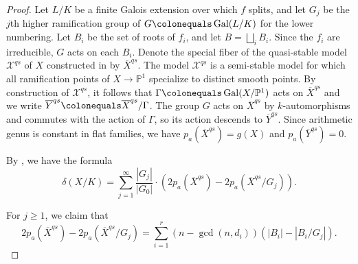 \documentclass[12pt]{amsart}
\numberwithin{equation}{section}
\theoremstyle{definition}
\newcommand{\ol}[1]{\overline{#1}}
\newcommand{\proj}{\mathbb P}
\DeclareMathOperator{\Gal}{Gal}
\begin{document}
\begin{proof}
Let $L/K$ be a finite Galois extension over which $f$ splits, and let
$G_j$ be the $j$th higher ramification group of $G \colonequals \Gal(L/K)$ for the lower
numbering.  Let $B_i$ be the set of roots of $f_i$, and let $B = \bigsqcup_i B_i$.  Since the $f_i$ are irreducible, $G$ acts
on each $B_i$.  Denote the special fiber of
the quasi-stable model $\mathcal{X}^{qs}$ of $X$ constructed in
\cite[\S4]{BW_Glasgow} by $\overline{X}^{qs}$.  The model
$\mathcal{X}^{qs}$ is a semi-stable
model for which all ramification points of $X \to \proj^1$ specialize
to distinct smooth points. 
  By construction of $\mathcal{X}^{qs}$, it follows that $\Gamma \colonequals \Gal(X/\proj^1)$ acts on $\ol{X}^{qs}$ and we write
$\ol{Y}^{qs} \colonequals \ol{X}^{qs}/\Gamma$.  The group $G$ acts on
$\overline{X}^{qs}$ by $k$-automorphisms and commutes with the action
of $\Gamma$, so its action descends to $\ol{Y}^{qs}$.
Since arithmetic genus
is constant in flat families, we have $p_a(\ol{X}^{qs}) = g(X)$ and
$p_a(\ol{Y}^{qs}) = 0$.

By \cite[Theorem 2.13]{BW_Glasgow}, we have the formula
\begin{equation}\label{Ebasicswan}
\delta(X/K) = \sum_{j=1}^{\infty} \frac{|G_j|}{|G_0|} \cdot
(2p_a(\overline{X}^{qs})-2p_a(\overline{X}^{qs}/G_j)). 
\end{equation}

For $j \geq 1$, we claim that
\begin{equation}\label{EGjpart}
2p_a(\overline{X}^{qs}) -
2p_a(\overline{X}^{qs}/G_j) = \sum_{i =1}^r (n- \gcd(n, d_i))(|B_i| -
|B_i/G_j|).
\end{equation}


\end{proof}
\end{document}
